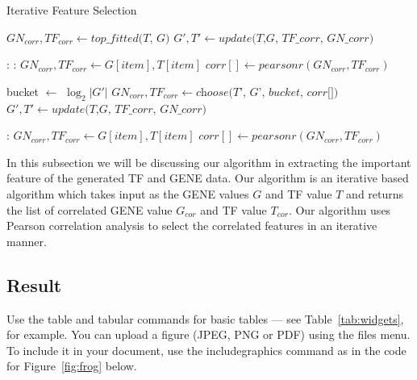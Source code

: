 \begin{algorithm}
\caption{Iterative Feature Selection}\label{iter}
\begin{algorithmic}[1]

\State $ GN_{corr}, TF_{corr} \gets  \textit{top\_fitted(T, G)}$
\State $ G', T'  \gets  \textit{update(T,G, TF\_{corr}, GN\_{corr})} $

: 
	:
    	\State $ GN_{corr}, TF_{corr} \gets G[item], T[item]$
        \State $corr[] \gets pearsonr(GN_{corr}, TF_{corr})$
    \EndFor
    
    \State bucket $\gets$ \( \log_2 |G'| \)
    \State $ GN_{corr} , TF_{corr} \gets  \textit{choose(T', G', bucket, corr[])}$
   \State $ G', T'  \gets  \textit{update(T,G, TF\_{corr}, GN\_{corr})} $
\EndWhile

:
    \State $ GN_{corr}, TF_{corr} \gets G[item], T[item]$
    \State $corr[] \gets pearsonr(GN_{corr}, TF_{corr})$
\EndFor

\EndProcedure
\end{algorithmic}
\end{algorithm}

In this subsection we will be discussing our algorithm in extracting the important feature of the generated TF and GENE data. Our algorithm is an iterative based algorithm which takes input as the GENE values $G$ and TF value $T$ and returns the list of correlated GENE value $G_{cor}$ and TF value $T_{cor}$. Our algorithm uses Pearson correlation analysis to select the correlated features in an iterative manner.


\subsection{Result}

Use the table  and tabular commands for basic tables --- see Table~\ref{tab:widgets}, for example. You can upload a figure (JPEG, PNG or PDF) using the files menu. To include it in your document, use the includegraphics command as in the code for Figure~\ref{fig:frog} below.


